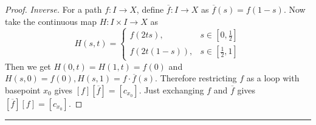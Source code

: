 \begin{proof}
\textit{Inverse.} For a path $f:I\rightarrow X$, define $\overline{f}:I\rightarrow X$ as $\overline{f}(s)=f(1-s)$. Now take the continuous map $H:I\times I\rightarrow X$ as
\begin{equation}
H(s,t)=\begin{cases}
f(2ts),&s\in [0,\frac{1}{2}]\\
f(2t(1-s)),&s\in [\frac{1}{2},1]
\end{cases}
\end{equation}
Then we get $H(0,t)=H(1,t)=f(0)$ and $H(s,0)=f(0),H(s,1)=f\cdot \overline{f}(s)$. Therefore restricting $f$ as a loop with basepoint $x_0$ gives $[f][\overline{f}]=[c_{x_0}]$. Just exchanging $f$ and $\overline{f}$ gives $[\overline{f}][f]=[c_{x_0}]$.
\end{proof}

\noindent\rule{\textwidth}{1pt}
\newline